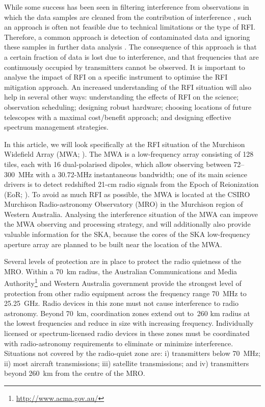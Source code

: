 \documentclass{pasa}
\begin{document}
While some success has been seen in filtering interference from observations in which the data samples are cleaned from the contribution of interference \citep{spatial-filtering-parkes-multibeam-for-pulses,rfi-spatial-processing-hellbourg-2014}, such an approach is often not feasible due to technical limitations or the type of RFI. Therefore, a common approach is detection of contaminated data and ignoring these samples in further data analysis \citep{statistical-rfi-removal,pieflag-middelberg,post-correlation-rfi-classification,prasad-flagcal-2012,serpent-peck-2013}. The consequence of this approach is that a certain fraction of data is lost due to interference, and that frequencies that are continuously occupied by transmitters cannot be observed. It is important to analyse the impact of RFI on a specific instrument to optimise the RFI mitigation approach. An increased understanding of the RFI situation will also help in several other ways: understanding the effects of RFI on the science; observation scheduling; designing robust hardware; choosing locations of future telescopes with a maximal cost/benefit approach; and designing effective spectrum management strategies.

In this article, we will look specifically at the RFI situation of the Murchison Widefield Array (MWA; \citealt{mwa-design-2009,mwa}). The MWA is a low-frequency array consisting of 128 tiles, each with 16 dual-polarised dipoles, which allow observing between 72--300~MHz with a 30.72-MHz instantaneous bandwidth; one of its main science drivers is to detect redshifted 21-cm radio signals from the Epoch of Reionization (EoR; \citealt{bowman-science-with-the-mwa-2013}). To avoid as much RFI as possible, the MWA is located at the CSIRO Murchison Radio-astronomy Observatory (MRO) in the Murchison region of Western Australia. Analysing the interference situation of the MWA can improve the MWA observing and processing strategy, and will additionally also provide valuable information for the SKA, because the cores of the SKA low-frequency aperture array are planned to be built near the location of the MWA.

Several levels of protection are in place to protect the radio quietness of the MRO. Within a 70~km radius, the Australian Communications and Media Authority\footnote{\url{http://www.acma.gov.au/}} and Western Australia government provide the strongest level of protection from other radio equipment across the frequency range 70~MHz to 25.25~GHz. Radio devices in this zone must not cause interference to radio astronomy.  Beyond 70~km, coordination zones extend out to~260 km radius at the lowest frequencies and reduce in size with increasing frequency. Individually licensed or spectrum-licensed radio devices in these zones must be coordinated with radio-astronomy requirements to eliminate or minimize interference. Situations not covered by the radio-quiet zone are: i) transmitters below 70~MHz; ii) most aircraft transmissions; iii) satellite transmissions; and iv) transmitters beyond 260~km from the centre of the MRO.
\end{document}
